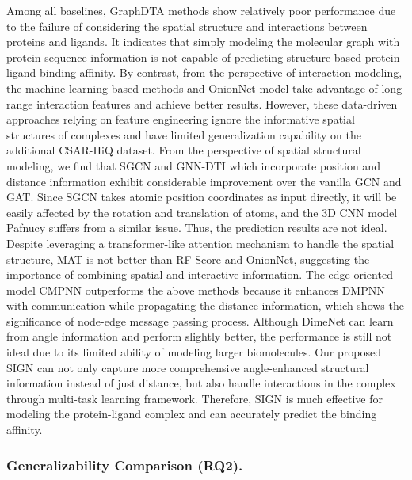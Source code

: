 \documentclass[sigconf]{acmart}
\newcommand{\model}{\textsf{SIGN}\xspace}
\begin{document}
Among all baselines, GraphDTA methods show relatively poor performance due to the failure of considering the spatial structure and interactions between proteins and ligands. It indicates that simply modeling the molecular graph with protein sequence information is not capable of predicting structure-based protein-ligand binding affinity. By contrast, from the perspective of interaction modeling, the machine learning-based methods and OnionNet model take advantage of long-range interaction features and achieve better results. However, these data-driven approaches relying on feature engineering ignore the informative spatial structures of complexes and have limited generalization capability on the additional CSAR-HiQ dataset.
From the perspective of spatial structural modeling, we find that SGCN and GNN-DTI which incorporate position and distance information exhibit considerable improvement over the vanilla GCN and GAT. Since SGCN takes atomic position coordinates as input directly, it will be easily affected by the rotation and translation of atoms, and the 3D CNN model Pafnucy suffers from a similar issue. Thus, the prediction results are not ideal. Despite leveraging a transformer-like attention mechanism to handle the spatial structure, MAT is not better than RF-Score and OnionNet, suggesting the importance of combining spatial and interactive information. The edge-oriented model CMPNN outperforms the above methods because it enhances DMPNN with communication while propagating the distance information, which shows the significance of node-edge message passing process. Although DimeNet can learn from angle information and perform slightly better, the performance is still not ideal due to its limited ability of modeling larger biomolecules. Our proposed \model can not only capture more comprehensive angle-enhanced structural information instead of just distance, but also handle interactions in the complex through multi-task learning framework. Therefore, \model is much effective for modeling the protein-ligand complex and can accurately predict the binding affinity.



\subsubsection{Generalizability Comparison (RQ2).}
\end{document}

